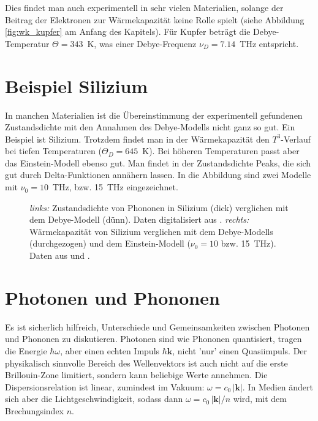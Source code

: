 Dies findet man auch experimentell in sehr vielen Materialien, solange der Beitrag der Elektronen zur Wärmekapazität keine Rolle spielt (siehe Abbildung \ref{fig:wk_kupfer} am Anfang des Kapitels). Für Kupfer beträgt die Debye-Temperatur $\Theta = 343$~K, was einer Debye-Frequenz $\nu_D = 7.14$~THz entspricht.



\section{Beispiel Silizium}

In manchen Materialien ist die Übereinstimmung der experimentell gefundenen Zustandsdichte mit den Annahmen des Debye-Modells nicht ganz so gut. Ein Beispiel ist Silizium. Trotzdem findet man in der Wärmekapazität den $T^3$-Verlauf bei tiefen Temperaturen ($\Theta_D = 645$~K). Bei höheren Temperaturen passt aber das Einstein-Modell ebenso gut. Man findet in der Zustandsdichte Peaks, die sich gut durch Delta-Funktionen annähern lassen.  In die Abbildung sind zwei Modelle mit $\nu_0 = 10$~THz, bzw. 15~THz eingezeichnet.




\begin{figure}
  \caption{ \textit{links:} Zustandsdichte von Phononen in Silizium (dick) verglichen mit dem Debye-Modell (dünn). Daten digitalisiert aus \cite{dolling66_si}. \textit{rechts:} Wärmekapazität von Silizium verglichen mit dem Debye-Modells (durchgezogen) und dem Einstein-Modell ($\nu_0=10$ bzw. 15~THz). Daten aus \cite{Flubacher59_si} und \cite{Okhotin72_si}. \label{fig:wk_Si}}
\end{figure}



\section{Photonen und Phononen}

Es ist sicherlich hilfreich, Unterschiede und Gemeinsamkeiten zwischen  Photonen und Phononen zu diskutieren. Photonen sind wie Phononen quantisiert, tragen die Energie $\hbar \omega$, aber einen echten Impuls $\hbar \mathbf{k}$, nicht 'nur' einen Quasiimpuls. Der physikalisch sinnvolle Bereich des Wellenvektors ist auch nicht auf die erste Brillouin-Zone limitiert, sondern kann beliebige Werte annehmen. Die Dispersionsrelation ist linear, zumindest im Vakuum: $\omega = c_0 \, | \mathbf{k} |$. In Medien ändert sich aber die Lichtgeschwindigkeit, sodass dann $\omega = c_0 \, | \mathbf{k} | / n$ wird, mit dem Brechungsindex $n$.

